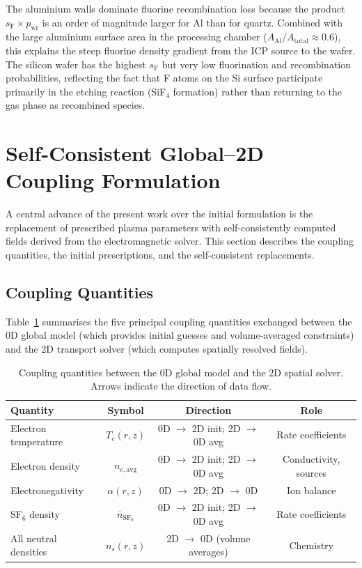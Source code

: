 \documentclass[11pt,a4paper]{report}
\newcommand{\SFsix}{\mathrm{SF}_6}
\newcommand{\Te}{T_e}
\begin{document}
The aluminium walls dominate fluorine recombination loss because the product $s_\mathrm{F} \times p_\mathrm{wr}$ is an order of magnitude larger for Al than for quartz.  Combined with the large aluminium surface area in the processing chamber ($A_\mathrm{Al}/A_\mathrm{total} \approx 0.6$), this explains the steep fluorine density gradient from the ICP source to the wafer.  The silicon wafer has the highest $s_\mathrm{F}$ but very low fluorination and recombination probabilities, reflecting the fact that F atoms on the Si surface participate primarily in the etching reaction (SiF$_4$ formation) rather than returning to the gas phase as recombined species.


\section{Self-Consistent Global--2D Coupling Formulation}
\label{sec:0d-2d-coupling}

A central advance of the present work over the initial formulation is the replacement of prescribed plasma parameters with self-consistently computed fields derived from the electromagnetic solver.  This section describes the coupling quantities, the initial prescriptions, and the self-consistent replacements.

\subsection{Coupling Quantities}

Table~\ref{tab:coupling-quantities} summarises the five principal coupling quantities exchanged between the 0D global model (which provides initial guesses and volume-averaged constraints) and the 2D transport solver (which computes spatially resolved fields).

\begin{table}[H]
\centering
\caption{Coupling quantities between the 0D global model and the 2D spatial solver.  Arrows indicate the direction of data flow.}
\label{tab:coupling-quantities}
\begin{tabular}{@{}lccc@{}}
\toprule
\textbf{Quantity} & \textbf{Symbol} & \textbf{Direction} & \textbf{Role} \\
\midrule
Electron temperature  & $\Te(r,z)$            & 0D $\to$ 2D init; 2D $\to$ 0D avg   & Rate coefficients \\
Electron density      & $n_{e,\mathrm{avg}}$  & 0D $\to$ 2D init; 2D $\to$ 0D avg   & Conductivity, sources \\
Electronegativity     & $\alpha(r,z)$         & 0D $\to$ 2D; 2D $\to$ 0D            & Ion balance \\
SF$_6$ density        & $\bar{n}_{\SFsix}$    & 0D $\to$ 2D init; 2D $\to$ 0D avg   & Rate coefficients \\
All neutral densities & $n_s(r,z)$            & 2D $\to$ 0D (volume averages)        & Chemistry \\
\bottomrule
\end{tabular}
\end{table}
\end{document}

